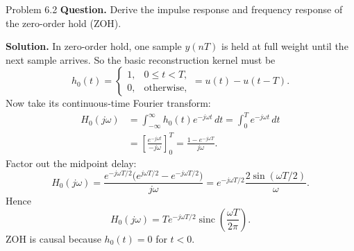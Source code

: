 \documentclass[10pt]{article}
\newcommand{\sinc}{\operatorname{sinc}}
\newcommand{\Prompt}[1]{\textbf{Question.} #1}
\newcommand{\SketchLabel}{\tcblower\textbf{Solution.}}
\begin{document}
\begin{examplebox}{Problem 6.2}
  \Prompt{Derive the impulse response and frequency response of the zero-order hold (ZOH).}

  \medskip
  \SketchLabel{}
  In zero-order hold, one sample \(y(nT)\) is held at full weight until the next sample arrives.
  So the basic reconstruction kernel must be
  \[
    h_0(t)=
    \begin{cases}
      1,& 0\le t<T,\\
      0,& \text{otherwise},
    \end{cases}
    =u(t)-u(t-T).
  \]
  Now take its continuous-time Fourier transform:
  \[
    \begin{aligned}
      H_0(j\omega)
      &=\int_{-\infty}^{\infty} h_0(t)e^{-j\omega t}\,dt
      =\int_0^T e^{-j\omega t}\,dt \\
      &=\left[\frac{e^{-j\omega t}}{-j\omega}\right]_0^T
      =\frac{1-e^{-j\omega T}}{j\omega}.
    \end{aligned}
  \]
  Factor out the midpoint delay:
  \[
    H_0(j\omega)
    =\frac{e^{-j\omega T/2}\bigl(e^{j\omega T/2}-e^{-j\omega T/2}\bigr)}{j\omega}
    =e^{-j\omega T/2}\frac{2\sin(\omega T/2)}{\omega}.
  \]
  Hence
  \[
    H_0(j\omega)=Te^{-j\omega T/2}\sinc\!\left(\frac{\omega T}{2\pi}\right).
  \]
  ZOH is causal because \(h_0(t)=0\) for \(t<0\).

  \begin{center}
  \end{center}
\end{examplebox}

\newpage
\end{document}
